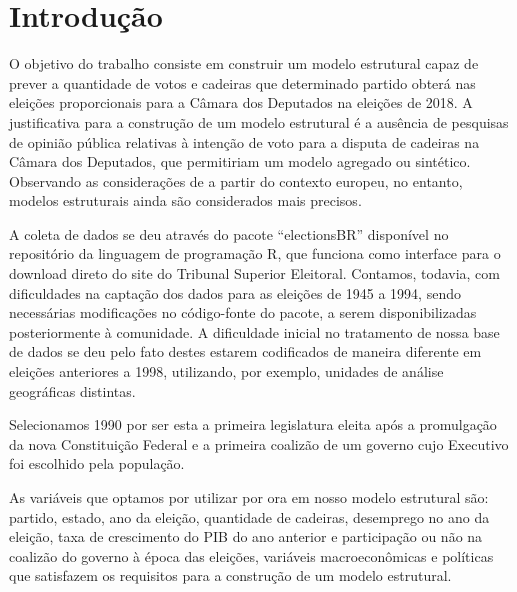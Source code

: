 \documentclass[
	article,			%
	11pt,				%
	oneside,			%
	a4paper,			%
	english,			%
	brazil,				%
	sumario=tradicional
	]{abntex2}
\begin{document}

\frenchspacing 

\maketitle


\textual

\section*{Introdução}

O objetivo do trabalho consiste em construir um modelo estrutural capaz de prever a quantidade de votos e cadeiras que determinado partido obterá nas eleições proporcionais para a Câmara dos Deputados na eleições de 2018. A justificativa para a construção de um modelo estrutural é a ausência de pesquisas de opinião pública relativas à intenção de voto para a disputa de cadeiras na Câmara dos Deputados, que permitiriam um modelo agregado ou sintético. Observando as considerações de  a partir do contexto europeu, no entanto, modelos estruturais ainda são considerados mais precisos.

A coleta de dados se deu através do pacote ``electionsBR'' disponível no repositório da linguagem de programação R, que funciona como interface para o download direto do site do Tribunal Superior Eleitoral. Contamos, todavia, com dificuldades na captação dos dados para as eleições de 1945 a 1994, sendo necessárias modificações no código-fonte do pacote, a serem disponibilizadas posteriormente à comunidade. A dificuldade inicial no tratamento de nossa base de dados se deu pelo fato destes estarem codificados de maneira diferente em eleições anteriores a 1998, utilizando, por exemplo, unidades de análise geográficas distintas.

Selecionamos 1990 por ser esta a primeira legislatura eleita após a promulgação da nova Constituição Federal e a primeira coalizão de um governo cujo Executivo foi escolhido pela população.

As variáveis que optamos por utilizar por ora em nosso modelo estrutural são: partido, estado, ano da eleição, quantidade de cadeiras, desemprego no ano da eleição, taxa de crescimento do PIB do ano anterior e participação ou não na coalizão do governo à época das eleições, variáveis macroeconômicas e políticas que satisfazem os requisitos para a construção de um modelo estrutural.
\end{document}
